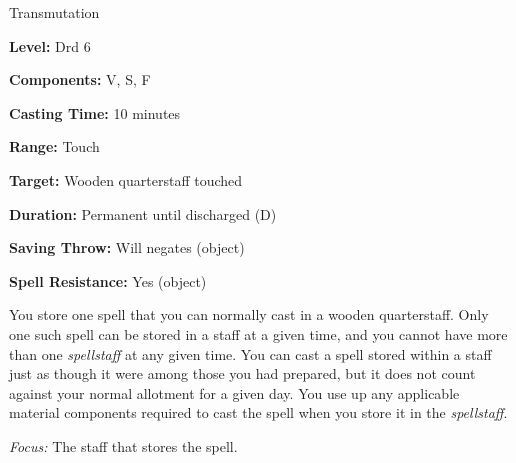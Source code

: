
Transmutation

\textbf{Level:} Drd 6

\textbf{Components:} V, S, F

\textbf{Casting Time:} 10 minutes

\textbf{Range:} Touch

\textbf{Target:} Wooden quarterstaff touched

\textbf{Duration:} Permanent until discharged (D)

\textbf{Saving Throw:} Will negates (object)

\textbf{Spell Resistance:} Yes (object)

You store one spell that you can normally cast in a wooden quarterstaff. Only one 
such spell can be stored in a staff at a given time, and you cannot have more than 
one \textit{spellstaff} at any given time. You can cast a spell stored within a 
staff just as though it were among those you had prepared, but it does not count 
against your normal allotment for a given day. You use up any applicable material 
components required to cast the spell when you store it in the \textit{spellstaff}.

\textit{Focus:} The staff that stores the spell.

